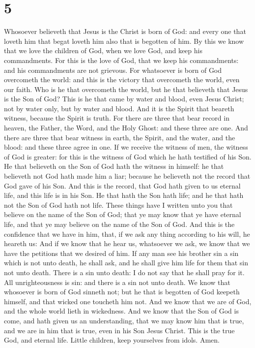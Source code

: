 \hypertarget{section-4}{%
\section{5}\label{section-4}}

 Whosoever believeth that Jesus is the Christ is born of
God: and every one that loveth him that begat loveth him also that is
begotten of him.  By this we know that we love the children
of God, when we love God, and keep his commandments.  For
this is the love of God, that we keep his commandments: and his
commandments are not grievous.  For whatsoever is born of
God overcometh the world: and this is the victory that overcometh the
world, even our faith.  Who is he that overcometh the world,
but he that believeth that Jesus is the Son of God?  This is
he that came by water and blood, even Jesus Christ; not by water only,
but by water and blood. And it is the Spirit that beareth witness,
because the Spirit is truth.  For there are three that bear
record in heaven, the Father, the Word, and the Holy Ghost: and these
three are one.  And there are three that bear witness in
earth, the Spirit, and the water, and the blood: and these three agree
in one.  If we receive the witness of men, the witness of
God is greater: for this is the witness of God which he hath testified
of his Son.  He that believeth on the Son of God hath the
witness in himself: he that believeth not God hath made him a liar;
because he believeth not the record that God gave of his Son.
 And this is the record, that God hath given to us eternal
life, and this life is in his Son.  He that hath the Son
hath life; and he that hath not the Son of God hath not life.
 These things have I written unto you that believe on the
name of the Son of God; that ye may know that ye have eternal life, and
that ye may believe on the name of the Son of God.  And
this is the confidence that we have in him, that, if we ask any thing
according to his will, he heareth us:  And if we know that
he hear us, whatsoever we ask, we know that we have the petitions that
we desired of him.  If any man see his brother sin a sin
which is not unto death, he shall ask, and he shall give him life for
them that sin not unto death. There is a sin unto death: I do not say
that he shall pray for it.  All unrighteousness is sin: and
there is a sin not unto death.  We know that whosoever is
born of God sinneth not; but he that is begotten of God keepeth himself,
and that wicked one toucheth him not.  And we know that we
are of God, and the whole world lieth in wickedness.  And
we know that the Son of God is come, and hath given us an understanding,
that we may know him that is true, and we are in him that is true, even
in his Son Jesus Christ. This is the true God, and eternal life.
 Little children, keep yourselves from idols. Amen.
